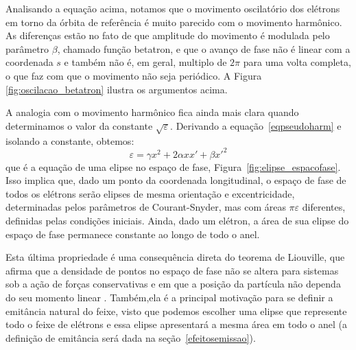 Analisando a equação acima, notamos que o movimento oscilatório dos elétrons em torno da órbita de referência é muito parecido com o movimento harmônico. As diferenças estão no fato de que amplitude do movimento é modulada pelo parâmetro $\beta$, chamado função betatron, e que o avanço de fase não é linear com a coordenada $s$ e também não é, em geral, multiplo de $2 \pi$ para uma volta completa, o que faz com que o movimento não seja periódico. A Figura \ref{fig:oscilacao_betatron} ilustra os argumentos acima.


A analogia com o movimento harmônico fica ainda mais clara quando determinamos o valor da constante $\sqrt{\varepsilon}$. Derivando a \mbox{equação \ref{eqpseudoharm}} e isolando a constante, obtemos:
\begin{equation}
 \varepsilon = \gamma x^2 + 2 \alpha x x' + \beta x'^2
\end{equation}
que é a equação de uma elipse no espaço de fase, \mbox{Figura \ref{fig:elipse_espacofase}}. Isso implica que, dado um ponto da coordenada longitudinal, o espaço de fase de todos os elétrons serão elipses de mesma orientação e excentricidade, determinadas pelos parâmetros de Courant-Snyder, mas com áreas $\pi \varepsilon$ diferentes, definidas pelas condições iniciais. Ainda, dado um elétron, a área de sua elipse do espaço de fase permanece constante ao longo de todo o anel.


Esta última propriedade é uma consequência direta do teorema de Liouville, que afirma que a densidade de pontos no espaço de fase não se altera para sistemas sob a ação de forças conservativas e em que a posição da partícula não dependa do seu momento linear \cite{Wiedemann3}. Também,ela é a principal motivação para se definir a emitância natural do feixe, visto que podemos escolher uma elipse que represente todo o feixe de elétrons e essa elipse apresentará a mesma área em todo o anel (a definição de emitância será dada na \mbox{seção \ref{efeitosemissao}}).

